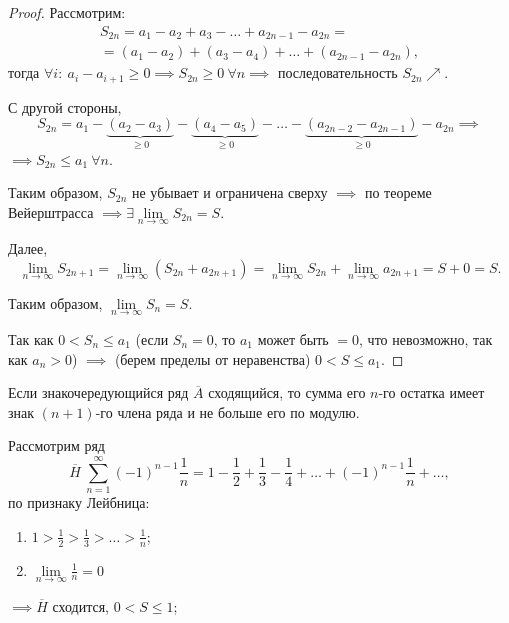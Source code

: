 \begin{proof}
    Рассмотрим:
    \begin{multline*}
        S_{2n} = a_1 - a_2 + a_3 - \ldots + a_{2n - 1} - a_{2n} = \\
        = (a_1 - a_2) + (a_3 - a_4) + \ldots + (a_{2n-1} - a_{2n}),
    \end{multline*}
    тогда $\forall i: \ a_i - a_{i+1} \geqslant 0 \implies S_{2n}\geqslant 0 \ \forall n \implies$ последовательность $S_{2n} \nearrow$.

    С другой стороны,
    \[
        S_{2n} = a_1 - \underbrace{(a_2 - a_3)}_{\geqslant 0} - \underbrace{(a_4 - a_5)}_{\geqslant 0} - \ldots - \underbrace{(a_{2n-2} - a_{2n-1})}_{\geqslant0} - a_{2n} \implies
    \]
    $\implies S_{2n} \leqslant a_1 \ \forall n$.

    Таким образом, $S_{2n}$ не убывает и ограничена сверху $\implies$ по теореме Вейерштрасса $\implies \exists \underset{n\rightarrow\infty}{\lim} S_{2n} = S$.

    Далее,
    \[
        \underset{n\rightarrow\infty}{\lim}S_{2n+1} = \underset{n\rightarrow\infty}{\lim}(S_{2n} + a_{2n+1}) = \underset{n\rightarrow\infty}{\lim}S_{2n} + \underset{n\rightarrow\infty}{\lim} a_{2n+1} = S + 0 = S.
    \]

    Таким образом, $\underset{n\rightarrow\infty}{\lim}S_n = S$.

    Так как $0 < S_n \leqslant a_1$ (если $S_n = 0$, то $a_1$ может быть $=0$, что невозможно, так как $a_n > 0$) $\implies$ (берем пределы от неравенства) $0 < S \leqslant a_1$.
\end{proof}

\begin{corollary}
    Если знакочередующийся ряд $\overline{A}$ сходящийся, то сумма его $n$-го остатка имеет знак $(n+1)$-го члена ряда и не больше его по модулю.
\end{corollary}

\begin{example}
    Рассмотрим ряд
    \[
        \overline{H} \ \sum_{n=1}^{\infty}(-1)^{n-1}\frac{1}{n} = 1 - \frac{1}{2} + \frac{1}{3} - \frac{1}{4} + \ldots + (-1)^{n-1}\frac{1}{n} + \ldots,
    \]
    по признаку Лейбница:
    \begin{enumerate}
        \item $1 > \frac{1}{2} > \frac{1}{3} > \ldots > \frac{1}{n}$;
        \item $\underset{n\rightarrow\infty}{\lim}\frac{1}{n} = 0$
    \end{enumerate}
    $\implies \overline{H}$ сходится, $0 < S \leqslant 1$;
\end{example}

